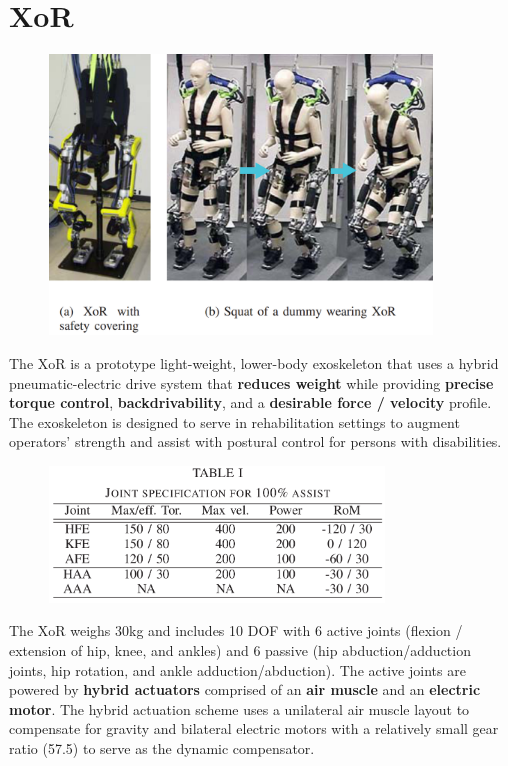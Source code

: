 \section{XoR}
\label{exo:XoR}
\begin{refsection}


\begin{figure}[ht]
  \centering
  \includegraphics[width=4.0in]{exos/figs/xor.png}
\end{figure}

The XoR is a prototype light-weight, lower-body exoskeleton that uses a hybrid pneumatic-electric drive system that \textbf{reduces weight} while providing \textbf{precise torque control}, \textbf{backdrivability}, and a \textbf{desirable force / velocity} profile.  The exoskeleton is designed to serve in rehabilitation settings to augment operators' strength and assist with postural control for persons with disabilities.

\begin{figure}[ht]
  \centering
  \includegraphics[width=3.5in]{exos/figs/xor_joint_rom.png}
\end{figure}

The XoR weighs 30kg and includes 10 DOF with 6 active joints (flexion / extension of hip, knee, and ankles) and 6 passive (hip abduction/adduction joints, hip rotation, and ankle adduction/abduction).  The active joints are powered by \textbf{hybrid actuators} comprised of an \textbf{air muscle} and an \textbf{electric motor}.  The hybrid actuation scheme uses a unilateral air muscle layout to compensate for gravity and bilateral electric motors with a relatively small gear ratio (57.5) to serve as the dynamic compensator.


\end{refsection}
